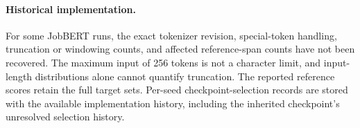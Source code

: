 \paragraph{Historical implementation.}
For some JobBERT runs, the exact tokenizer revision, special-token handling, truncation or windowing counts, and affected reference-span counts have not been recovered. The maximum input of 256 tokens is not a character limit, and input-length distributions alone cannot quantify truncation. The reported reference scores retain the full target sets. Per-seed checkpoint-selection records are stored with the available implementation history, including the inherited checkpoint's unresolved selection history.
